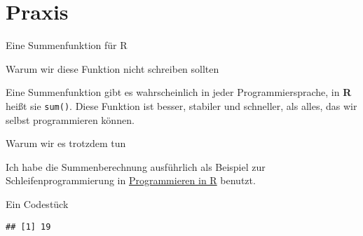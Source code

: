 \section{Praxis}\label{praxis}

\begin{frame}[fragile]{Eine Summenfunktion für R}

\begin{block}{Warum wir diese Funktion nicht schreiben sollten}

Eine Summenfunktion gibt es wahrscheinlich in jeder Programmiersprache,
in \textbf{R} heißt sie \texttt{sum()}. Diese Funktion ist besser,
stabiler und schneller, als alles, das wir selbst programmieren können.

\end{block}

\begin{block}{Warum wir es trotzdem tun}

Ich habe die Summenberechnung ausführlich als Beispiel zur
Schleifenprogrammierung in
\href{https://fvafrcu.github.io/programmieren_in_r/\#gute-schleifen}{Programmieren
in R} benutzt.

\end{block}

\end{frame}

\begin{frame}[fragile]{Ein Codestück}

\begin{Shaded}
\begin{Highlighting}[]
\StringTok{ }\NormalTok{(}\NormalTok{, }\NormalTok{, }\NormalTok{, }\NormalTok{)}
\StringTok{ }
    \StringTok{ }\StringTok{ }
\NormalTok{\}}
\end{Highlighting}
\end{Shaded}

\begin{verbatim}
## [1] 19
\end{verbatim}

\end{frame}


